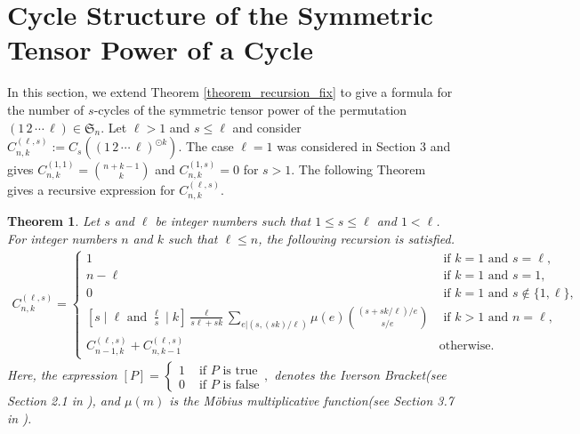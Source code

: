 \documentclass[12pt]{amsart}
\newtheorem{theorem}{Theorem}[section]
\begin{document}
\section{Cycle Structure of the Symmetric Tensor Power of a Cycle}
In this section, we extend Theorem \ref{theorem_recursion_fix} to give a formula for the number of $s$-cycles of the symmetric tensor power of the permutation $(1\, 2\, \cdots \, \ell)\in \mathfrak{S}_n$. Let $\ell > 1$ and  $s\leq \ell$ and consider $C^{(\ell,s)}_{n,k}:=C_s((1\,2\, \cdots \, \ell)^{\odot k})$. The case $\ell = 1$ was considered in Section 3 and gives $C^{(1,1)}_{n,k}=\binom{n+k-1}{k}$ and $C^{(1,s)}_{n,k} = 0$ for $s>1$. The following Theorem gives a recursive expression for $C^{(\ell,s)}_{n,k}$.

\begin{theorem} 
\label{theo:recur}
Let $s$ and $\ell$ be integer numbers such that $1\leq s\leq \ell$ and $1<\ell$. For integer numbers $n$ and $k$ such that $\ell\leq n$, the following recursion is satisfied.
\begin{align}
    C^{(\ell,s)}_{n,k} =\begin{cases}
    1 & \text{ if }k=1\text{ and }s=\ell,\\
    n-\ell & \text{ if }k=1\text{ and }s=1,\\
    0 & \text{ if }k=1\text{ and }s\not \in \{1,\ell\},\\
 \displaystyle \left [s\mid \ell \text{ and }\frac{\ell}{s}\mid k\right ]\frac{\ell}{s\ell+sk}\sum _{e|(s,(sk)/\ell)}\mu(e)\binom{(s+sk/\ell)/e}{s/e} & \text{ if }k>1 \text{ and }n=\ell,\\
 C^{(\ell,s)}_{n-1,k}+C^{(\ell,s)}_{n,k-1} & \text{otherwise.}
    \end{cases}
\end{align}
Here, the expression $\left [P\right ] = \begin{cases}1 & \text{ if }P\text{ is true}\\0 & \text{ if }P\text{ is false}\end{cases},$ denotes the \textit{Iverson Bracket}(see Section 2.1 in \cite{graham94}), and $\mu (m)$ is the Möbius multiplicative function(see Section 3.7 in \cite{Stanley_2023}).
\end{theorem}
\end{document}
